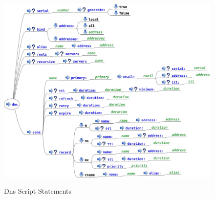 \begin{figure}[htp]
\centering
\includegraphics[angle=90,height=0.7\textheight]{dns_service_script}
\label{fig:dns_script_statements}
\caption{Dns Script Statements}
\end{figure}
